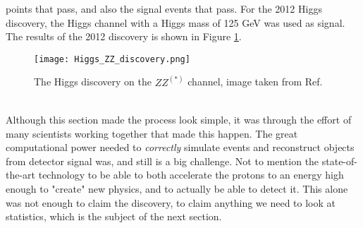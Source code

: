 \documentclass[12pt, a4paper]{book}
\begin{document}
points that pass, and also the signal events that pass. For the 2012 Higgs discovery, the Higgs channel with a Higgs mass of 125 GeV was used as signal. 
The results of the 2012 discovery is shown in Figure \ref{fig:Higgs_ZZ}.\\
\begin{figure}[!ht]
	\centering
    \texttt{[image: Higgs\_ZZ\_discovery.png]}
    \caption[The Higgs discovery on the $ZZ^{(*)}$ channel]{The Higgs discovery on the $ZZ^{(*)}$ channel, image taken from Ref. \cite{Higgs_discovery_2012}}\label{fig:Higgs_ZZ}
\end{figure}
\\Although this section made the process look simple, it was through the effort of many scientists working together that made this happen. The great computational power needed to \textit{correctly} simulate events and reconstruct objects from detector signal was, and still is a big challenge.
Not to mention the state-of-the-art technology to be able to both accelerate the protons to an energy high enough to "create" new physics, and to actually be able to detect it. This alone was not enough to claim the discovery, 
to claim anything we need to look at statistics, which is the subject of the next section.
\end{document}
